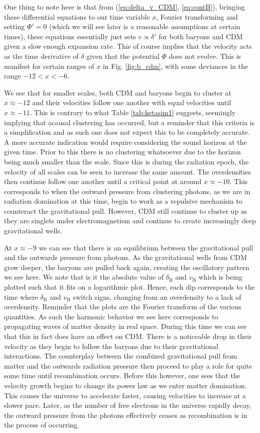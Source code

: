 \documentclass[%
reprint,
 amsmath,amssymb,
 aps,
]{revtex4-2}
\begin{document}
One thing to note here is that from (\ref{eq:delta_v_CDM}, \ref{eq:contB}), bringing these differential equations to our time variable $x$, Fourier transforming and setting $\Phi'=0$ (which we will see later is a reasonable assumptions at certain times), these equations essentially just sets $v\propto\delta'$ for both baryons and CDM given a slow enough expansion rate. This of course implies that the velocity acts as the time derivative of $\delta$ given that the potential $\Phi$ does not evolve. This is manifest for certain ranges of $x$ in Fig. \ref{fig:b_cdm}, with some deviances in the range $-12<x<-6$.

We see that for smaller scales, both CDM and baryons begin to cluster at $x\approx-12$ and their velocities follow one another with equal velocities until $x\approx-11$. This is contrary to what Table \ref{tab:ketasim1} suggests, seemingly implying that acausal clustering has occurred, but a reminder that this criteria is a simplification and as such one does not expect this to be completely accurate. A more accurate indication would require considering the sound horizon at the given time. Prior to this there is no clustering whatsoever due to the horizon being much smaller than the scale. Since this is during the radiation epoch, the velocity of all scales can be seen to increase the same amount. The overdensities then continue follow one another until a critical point at around $x\approx-10$. This corresponds to when the outward pressure from clustering photons, as we are in radiation domination at this time, begin to work as a repulsive mechanism to counteract the gravitational pull. However, CDM still continue to cluster up as they are singlets under electromagnetism and continue to create increasingly deep gravitational wells. 

At $x\approx-9$ we can see that there is an equilibrium between the gravitational pull and the outwards pressure from photons. As the gravitational wells from CDM grow deeper, the baryons are pulled back again, creating the oscillatory pattern we see here. We note that is it the absolute value of $\delta_\text{B}$ and $v_\text{B}$ which is being plotted such that it fits on a logarithmic plot. Hence, each dip corresponds to the time where $\delta_\text{B}$ and $v_\text{B}$ switch signs, changing from an overdensity to a lack of overdensity. Reminder that the plots are the Fourier transform of the various quantities. As such the harmonic behavior we see here corresponds to propagating waves of matter density in real space. During this time we can see that this in fact does have an effect on CDM. There is a noticeable drop in their velocity as they begin to follow the baryons due to their gravitational interactions. The counterplay between the combined gravitational pull from matter and the outwards radiation pressure then proceed to play a role for quite some time until recombination occurs. Before this however, one sees that the velocity growth begins to change its power law as we enter matter domination. This causes the universe to accelerate faster, causing velocities to increase at a slower pace. Later, as the number of free electrons in the universe rapidly decay, the outward pressure from the photons effectively ceases as recombination is in the process of occurring. 
\end{document}
